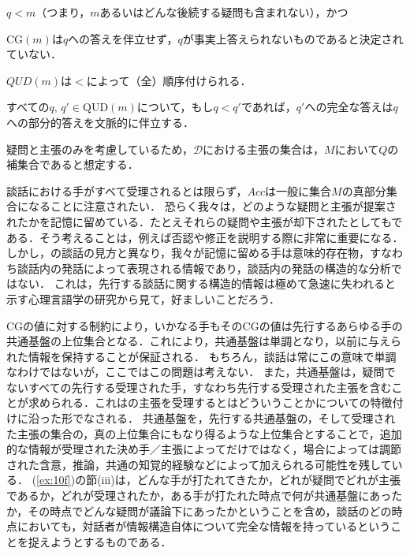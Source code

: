 \documentclass{goken}
\newcommand{\ori}[1]{\noindent\textcolor[gray]{0.7}{\fontsize{8pt}{8pt}\selectfont{\textsf{(p.~#1)}}} }
\begin{document}
\begin{exe}
\begin{xlist}
\begin{xlist}
\begin{xlist}
				\item $q < m$（つまり，$m$あるいはどんな後続する疑問も含まれない），かつ
				\item $\text{CG}(m)$は$q$への答えを伴立せず，$q$が事実上答えられないものであると決定されていない．
			\end{xlist}
			\item $QUD(m)$は$<$によって（全）順序付けられる．
			\ori{15}\item すべての$q,\, q' \in \text{QUD}(m)$について，もし$q < q'$であれば，$q'$への完全な答えは$q$への部分的答えを文脈的に伴立する．\label{ex:10giii}
		\end{xlist}
		\end{xlist}
\end{exe}


\noindent 疑問と主張のみを考慮しているため，$\mathcal{D}$における主張の集合は，$M$において$Q$の補集合であると想定する．

談話における手がすべて受理されるとは限らず，$Acc$は一般に集合$M$の真部分集合になることに注意されたい．
恐らく我々は，どのような疑問と主張が提案されたかを記憶に留めている．たとえそれらの疑問や主張が却下されたとしてもである．そう考えることは，例えば否認や修正を説明する際に非常に重要になる．
しかし，\citet{Carlson1982}の談話の見方と異なり，我々が記憶に留める手は意味的存在物，すなわち談話内の発話によって表現される情報であり，談話内の発話の構造的な分析ではない．
これは，先行する談話に関する構造的情報は極めて急速に失われると示す心理言語学の研究から見て，好ましいことだろう．

CGの値に対する制約により，いかなる手もそのCGの値は先行するあらゆる手の共通基盤の上位集合となる．これにより，共通基盤は単調となり，以前に与えられた情報を保持することが保証される．
もちろん，談話は常にこの意味で単調なわけではないが，ここではこの問題は考えない．
また，共通基盤は，疑問でないすべての先行する受理された手，すなわち先行する受理された主張を含むことが求められる．これは\citet{Stalnaker1978}の主張を受理するとはどういうことかについての特徴付けに沿った形でなされる．
共通基盤を，先行する共通基盤の，そして受理された主張の集合の，真の上位集合にもなり得るような上位集合とすることで，追加的な情報が受理された決め手／主張によってだけではなく，場合によっては調節された含意，推論，共通の知覚的経験などによって加えられる可能性を残している．
(\ref{ex:10f})の節(iii)は，どんな手が打たれてきたか，どれが疑問でどれが主張であるか，どれが受理されたか，ある手が打たれた時点で何が共通基盤にあったか，その時点でどんな疑問が議論下にあったかということを含め，談話のどの時点においても，対話者が情報構造自体について完全な情報を持っているということを捉えようとするものである．
\end{document}
